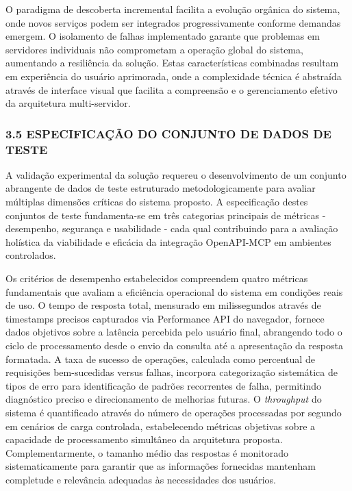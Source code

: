 \documentclass[
]{article}
\begin{document}
O paradigma de descoberta incremental facilita a evolução orgânica do
sistema, onde novos serviços podem ser integrados progressivamente
conforme demandas emergem. O isolamento de falhas implementado garante
que problemas em servidores individuais não comprometam a operação
global do sistema, aumentando a resiliência da solução. Estas
características combinadas resultam em experiência do usuário
aprimorada, onde a complexidade técnica é abstraída através de interface
visual que facilita a compreensão e o gerenciamento efetivo da
arquitetura multi-servidor.

\subsubsection{3.5 ESPECIFICAÇÃO DO CONJUNTO DE DADOS DE
TESTE}\label{especificauxe7uxe3o-do-conjunto-de-dados-de-teste}

A validação experimental da solução requereu o desenvolvimento de um
conjunto abrangente de dados de teste estruturado metodologicamente para
avaliar múltiplas dimensões críticas do sistema proposto. A
especificação destes conjuntos de teste fundamenta-se em três categorias
principais de métricas - desempenho, segurança e usabilidade - cada qual
contribuindo para a avaliação holística da viabilidade e eficácia da
integração OpenAPI-MCP em ambientes controlados.

Os critérios de desempenho estabelecidos compreendem quatro métricas
fundamentais que avaliam a eficiência operacional do sistema em
condições reais de uso. O tempo de resposta total, mensurado em
milissegundos através de timestamps precisos capturados via Performance
API do navegador, fornece dados objetivos sobre a latência percebida
pelo usuário final, abrangendo todo o ciclo de processamento desde o
envio da consulta até a apresentação da resposta formatada. A taxa de
sucesso de operações, calculada como percentual de requisições
bem-sucedidas versus falhas, incorpora categorização sistemática de
tipos de erro para identificação de padrões recorrentes de falha,
permitindo diagnóstico preciso e direcionamento de melhorias futuras. O
\emph{throughput} do sistema é quantificado através do número de
operações processadas por segundo em cenários de carga controlada,
estabelecendo métricas objetivas sobre a capacidade de processamento
simultâneo da arquitetura proposta. Complementarmente, o tamanho médio
das respostas é monitorado sistematicamente para garantir que as
informações fornecidas mantenham completude e relevância adequadas às
necessidades dos usuários.
\end{document}
